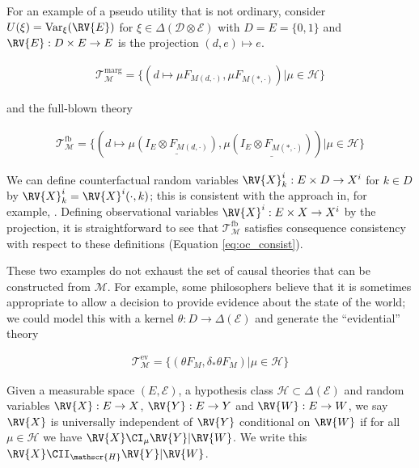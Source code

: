 For an example of a pseudo utility that is not ordinary, consider $U(\xi) = \text{Var}_{\xi}(\RV{E})$ for $\xi\in\Delta(\mathcal{D}\otimes\mathcal{E})$ with $D=E=\{0,1\}$ and $\RV{E}:D\times E\to E$ is the projection $(d,e)\mapsto e$.


\begin{example}
\begin{align}
    \mathscr{T}_{\mathscr{M}}^{\mathrm{marg}} = \{(d\mapsto \mu F_{M(d,\cdot)},\mu F_{M(*,\cdot)})|\mu\in \mathscr{H}\} 
\end{align}

and the full-blown theory

\begin{align}
        \mathscr{T}_{\mathscr{M}}^{\mathrm{fb}} = \{(d\mapsto \mu \underline{(I_E\otimes F_{M(d,\cdot)})},\mu \underline{(I_E\otimes F_{M(*,\cdot)})})|\mu\in \mathscr{H}\}
\end{align}

We can define counterfactual random variables $\RV{X}^i_k:E\times D\to X^i$ for $k\in D$ by $\RV{X}^i_k=\RV{X}^i(\cdot,k)$; this is consistent with the approach in, for example, \cite{balke_counterfactual_1994}. Defining observational variables $\RV{X}^i:E\times X\to X^i$ by the projection, it is straightforward to see that $\mathscr{T}^{\mathrm{fb}}_{\mathscr{M}}$ satisfies consequence consistency with respect to these definitions (Equation \ref{eq:oc_consist}).



These two examples do not exhaust the set of causal theories that can be constructed from $\mathscr{M}$. For example, some philosophers believe that it is sometimes appropriate to allow a decision to provide evidence about the state of the world; we could model this with a kernel $\theta:D\to \Delta(\mathcal{E})$ and generate the ``evidential'' theory

\begin{align}
        \mathscr{T}_{\mathscr{M}}^{\mathrm{ev}} = \{(\theta  F_{M},\delta_{*}\theta F_{M})|\mu\in \mathscr{H}\}
\end{align}

\end{example}



\begin{definition}\label{def:univ_indep}
Given a measurable space $(E,\mathcal{E})$, a hypothesis class $\mathscr{H}\subset\Delta(\mathcal{E})$ and random variables $\RV{X}:E\to X$, $\RV{Y}:E\to Y$ and $\RV{W}:E\to W$, we say $\RV{X}$ is universally independent of $\RV{Y}$ conditional on $\RV{W}$ if for all $\mu\in\mathscr{H}$ we have $\RV{X}\CI_\mu \RV{Y} | \RV{W}$. We write this $\RV{X} \CII_\mathscr{H} \RV{Y} | \RV{W}$.
\end{definition}

